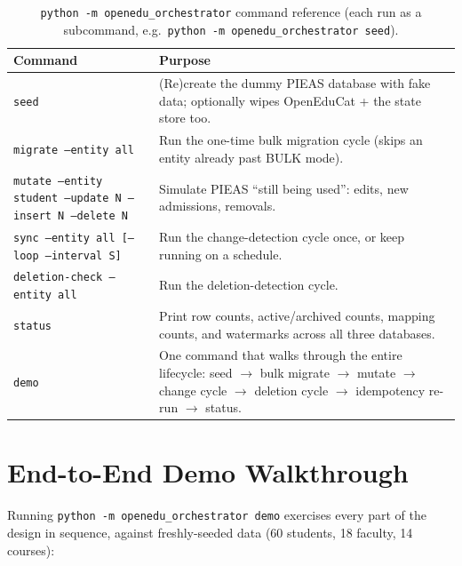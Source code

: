 \documentclass[11pt,a4paper]{article}
\begin{document}
\begin{table}[H]
\centering
\small
\begin{tabular}{@{}p{5.0cm}p{9.0cm}@{}}
\toprule
\textbf{Command} & \textbf{Purpose} \\
\midrule
\texttt{seed} & (Re)create the dummy PIEAS database with fake data; optionally wipes OpenEduCat
+ the state store too. \\
\texttt{migrate --entity all} & Run the one-time bulk migration cycle (skips an entity already
past BULK mode). \\
\texttt{mutate --entity student --update N --insert N --delete N} & Simulate PIEAS ``still
being used'': edits, new admissions, removals. \\
\texttt{sync --entity all [--loop --interval S]} & Run the change-detection cycle once, or keep
running on a schedule. \\
\texttt{deletion-check --entity all} & Run the deletion-detection cycle. \\
\texttt{status} & Print row counts, active/archived counts, mapping counts, and watermarks
across all three databases. \\
\texttt{demo} & One command that walks through the entire lifecycle: seed
$\rightarrow$ bulk migrate $\rightarrow$ mutate $\rightarrow$ change cycle $\rightarrow$
deletion cycle $\rightarrow$ idempotency re-run $\rightarrow$ status. \\
\bottomrule
\end{tabular}
\caption{\texttt{python -m openedu\_orchestrator} command reference (each run as a subcommand,
e.g.\ \texttt{python -m openedu\_orchestrator seed}).}
\end{table}

\section{End-to-End Demo Walkthrough}

Running \texttt{python -m openedu\_orchestrator demo} exercises every part of the design in
sequence, against freshly-seeded data (60 students, 18 faculty, 14 courses):
\end{document}
